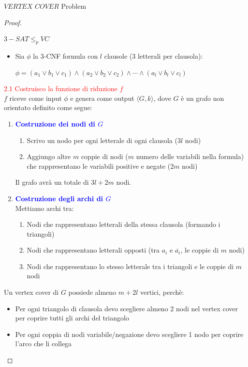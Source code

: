 \documentclass{article}  %
\theoremstyle{definition}
\begin{document}
\begin{theorem}{$VERTEX$ $COVER$ Problem}
\begin{proof}
\begin{center}
			$3-SAT \leq_p VC$
		\end{center}
		\begin{itemize}
			\item Sia $\phi$ la 3-CNF formula con $l$ clausole (3 letterali per clausola):
			      \begin{center}
				      $\phi = (a_1 \lor b_1 \lor c_1) \land (a_2 \lor b_2 \lor c_2) \land \cdots \land (a_l \lor b_l \lor c_l)$
			      \end{center}
		\end{itemize}
		\textcolor{red}{2.1 Costruisco la funzione di riduzione $f$} \\
		$f$ riceve come input $\phi$ e genera come output $\langle G,k \rangle$, dove $G$ è un grafo non orientato definito come segue:
		\begin{enumerate}
			\item \textcolor{blue}{\textbf{Costruzione dei nodi di $G$}}
			      \begin{enumerate}
				      \item Scrivo un nodo per ogni letterale di ogni clausola (3$l$ nodi)
				      \item Aggiungo altre $m$ coppie di nodi ($m$ numero delle variabili nella formula) che rappresentano le variabili positive e negate (2$m$ nodi)
			      \end{enumerate}
				  Il grafo avrà un totale di $3l+2m$ nodi.
			\item \textcolor{blue}{\textbf{Costruzione degli archi di $G$}} \\
			      Mettiamo archi tra:
			      \begin{enumerate}
				      \item Nodi che rappresentano letterali della stessa clausola (formando i triangoli)
				      \item Nodi che rappresentano letterali opposti (tra $a_i$ e $\overline{a_i}$, le coppie di $m$ nodi)
				      \item Nodi che rappresentano lo stesso letterale tra i triangoli e le coppie di $m$ nodi
			      \end{enumerate}
		\end{enumerate}
		Un vertex cover di $G$ possiede almeno $m+2l$ vertici, perchè:
		\begin{itemize}
			\item Per ogni triangolo di clausola devo scegliere almeno 2 nodi nel vertex cover per coprire tutti gli archi del triangolo
			\item Per ogni coppia di nodi variabile/negazione devo scegliere 1 nodo per coprire l'arco che li collega

\end{itemize}
\end{proof}
\end{theorem}
\end{document}
